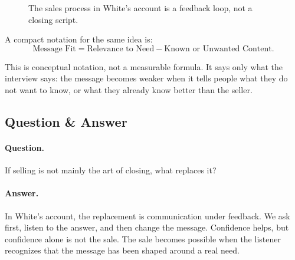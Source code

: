 \begin{figure}
\centering
{}
\caption{The sales process in White's account is a feedback loop, not a closing script.}
\end{figure}

A compact notation for the same idea is:
\begin{equation}
\text{Message Fit}
=
\text{Relevance to Need}
-
\text{Known or Unwanted Content}.
\end{equation}

This is conceptual notation, not a measurable formula. It says only what the interview says: the message becomes weaker when it tells people what they do not want to know, or what they already know better than the seller.

\subsection{Question \& Answer}

\paragraph{Question.}
If selling is not mainly the art of closing, what replaces it?

\paragraph{Answer.}
In White's account, the replacement is communication under feedback. We ask first, listen to the answer, and then change the message. Confidence helps, but confidence alone is not the sale. The sale becomes possible when the listener recognizes that the message has been shaped around a real need.

